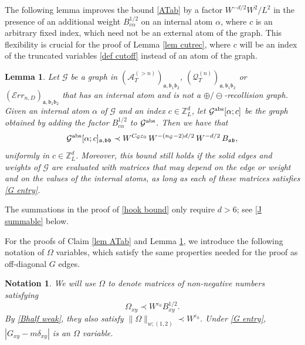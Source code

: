 \documentclass{article}
\newcommand{\1}{\mathds{1}}
\numberwithin{equation}{section}
\newcommand{\al}{\alpha}
\newcommand{\be}{\begin{equation}}
\newcommand{\ee}{\end{equation}}
\newcommand{\e}{{\varepsilon}}
\newcommand{\fa}{{\mathfrak a}}
\newcommand{\fb}{{\mathfrak b}}
\renewcommand{\cal}{\mathcal}
\newcommand{\Z}{\mathbb{Z}}
\theoremstyle{plain} %
\newtheorem{lemma}[theorem]{Lemma}
\newtheorem{notation}[theorem]{Notation}
\theoremstyle{remark}
\newcommand{\QTn}{\mathcal Q_T^{(n)}}
\newcommand{\ATn}{\mathcal A_T^{(>n)}}
\newcommand{\Err}{{\mathcal Err}}
\begin{document}
The following lemma improves the bound \eqref{ATab} by a factor $W^{-d/2}W^2/L^2$ in the presence of an additional weight $B^{1/2}_{c\al}$ on an internal atom $\al$, where $c$ is an arbitrary fixed index, which need not be an external atom of the graph. This flexibility is crucial for the proof of Lemma \ref{lem cutrec}, where $c$ will be an index of the truncated variables \eqref{def cutoff} instead of an atom of the graph.

\begin{lemma}\label{lem hook}
Let $\cal G$ be a graph in $(\ATn)_{\fa,\fb_1\fb_2}$, $(\QTn)_{\fa,\fb_1\fb_2}$ or $(\Err_{n,D})_{\fa,\fb_1\fb_2}$ that has an internal atom and is not a $\oplus/\ominus$-recollision graph. Given an internal atom $\al$ of $\cal G$ and an index $c\in \Z_L^d$, let $\cal G^{\rm abs}[\al;c]$ be the graph obtained by adding the factor $B^{1/2}_{c\al}$ to $\cal G^{\rm abs}$. Then we have that
\be\label{hook bound}
\cal G^{\rm abs}[\al;c]_{\fa,\fb\fb}\prec W^{C_{\cal G}\e_0}\, W^{-(n_{\cal G}-2)d/2}\, W^{-d/2}\,B_{\fa\fb},
\ee
uniformly in $c\in \Z_L^d$. Moreover, this bound still holds if the solid edges and weights of $\cal G$ are evaluated with matrices that may depend on the edge or weight and on the values of the internal atoms, as long as each of these matrices satisfies \eqref{G entry}.
\end{lemma}

The summations in the proof of \eqref{hook bound} only require $d>6$; see \eqref{J summable} below.

For the proofs of Claim \ref{lem ATab} and Lemma \ref{lem hook}, we introduce the following notation of $\Omega$ variables, which satisfy the same properties needed for the proof as off-diagonal $G$ edges.
\begin{notation}\label{Omega1}
We will use $\Omega$ to denote matrices of non-negative numbers satisfying
\be\label{Omega2}
\Omega_{x y} \prec W^{\e_0}B_{x y}^{1/2} .
\ee
By \eqref{Bhalf weak}, they also satisfy $\|\Omega\|_{w;(1,2)}\prec W^{\e_0}$. Under \eqref{G entry}, $|G_{xy}-m\delta_{xy}|$ is an $\Omega$ variable.
\end{notation}
\end{document}
